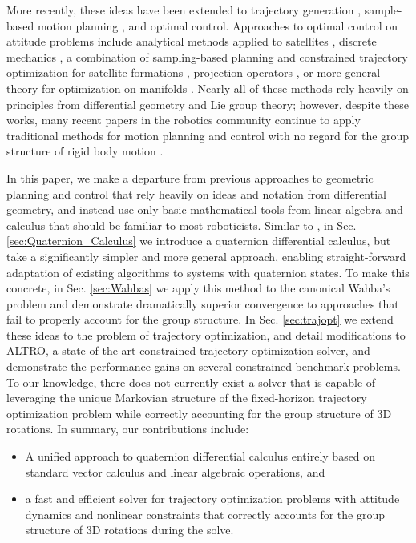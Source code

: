 \documentclass[letterpaper, 10 pt, conference]{ieeeconf}  %
\begin{document}
    More recently, these ideas have been extended to trajectory generation
    \cite{Zefran1998}, sample-based motion planning \cite{Zefran1999,Kuffner2004}, and
    optimal control. Approaches to optimal control on attitude problems include
    analytical methods applied to satellites \cite{Spindler1998}, discrete mechanics
    \cite{Kobilarov2011,Kobilarov2014, Lee2008}, a combination of sampling-based planning
    and constrained trajectory optimization for satellite formations \cite{Garcia2005,
    Aoude2008}, projection operators \cite{Saccon2013}, or more general theory for
    optimization on manifolds \cites{watterson2018trajectory}. Nearly all of these
    methods rely heavily on principles from differential geometry and Lie group theory;
    however, despite these works, many recent papers in the robotics community continue
    to apply traditional methods for motion planning and control with no regard for the
    group structure of rigid body motion \cite{Alothman2016,deCrousaz2015,
    Williams2017,Geisert2016}.
    
    In this paper, we make a departure from previous approaches to geometric planning and 
    control that rely heavily on ideas and notation from differential geometry, 
    and instead use only basic mathematical tools from linear algebra and calculus that 
    should be familiar to most roboticists. 
    Similar to \cite{Mandic2011,Xu2016}, in Sec. \ref{sec:Quaternion_Calculus} we introduce 
    a quaternion differential calculus, but take a significantly simpler and more general 
    approach, enabling straight-forward adaptation of 
    existing algorithms to systems with quaternion states. 
    To make this concrete, in Sec. \ref{sec:Wahbas} we apply this method to the canonical
    Wahba's problem and demonstrate dramatically superior convergence to approaches that
    fail to properly account for the group structure. 
    In Sec. \ref{sec:trajopt} we extend these ideas to the problem of trajectory optimization,
    and detail modifications to ALTRO, a state-of-the-art constrained trajectory optimization
    solver, and demonstrate the performance gains on several constrained benchmark problems.
    To our knowledge, there does not currently exist a solver that is capable of leveraging
    the unique Markovian structure of the fixed-horizon trajectory optimization problem while
    correctly accounting for the group structure of 3D rotations.
    In summary, our contributions include:

    \begin{itemize}
        \item A unified approach to quaternion differential calculus entirely based on
        standard vector calculus and linear algebraic operations, and
        \item a fast and efficient solver for trajectory optimization problems with 
        attitude dynamics and nonlinear constraints that correctly accounts for the group
        structure of 3D rotations during the solve.
    \end{itemize}
\end{document}
